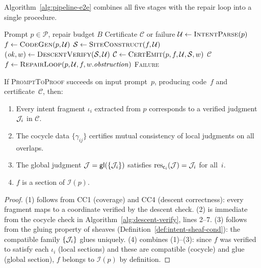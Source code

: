 \documentclass[11pt]{article}
\newcommand{\PromptToProof}{\textsc{PromptToProof}}
\newcommand{\IntentSheaf}{\mathcal{I}}
\newcommand{\ProofCert}{\mathcal{C}}
\newcommand{\PromptSpace}{\mathcal{P}}
\newcommand{\IntentFrag}{\iota}
\newcommand{\CoverFam}{\mathcal{U}}
\newcommand{\Cocycle}{\gamma}
\newcommand{\GlueMap}{\mathsf{gl}}
\newcommand{\IntentParse}{\textsc{IntentParse}}
\newcommand{\CodeGen}{\textsc{CodeGen}}
\newcommand{\SiteConstruct}{\textsc{SiteConstruct}}
\newcommand{\DescentVerify}{\textsc{DescentVerify}}
\newcommand{\CertEmit}{\textsc{CertEmit}}
\newcommand{\RepairLoop}{\textsc{RepairLoop}}
\begin{document}
Algorithm~\ref{alg:pipeline-e2e} combines all five stages with the
repair loop into a single procedure.

\begin{algorithm}[t]
\caption{\PromptToProof: End-to-end pipeline}\label{alg:pipeline-e2e}
\begin{algorithmic}[1]
\REQUIRE Prompt $p \in \PromptSpace$, repair budget $B$
\ENSURE Certificate $\ProofCert$ or failure
\STATE $\CoverFam \leftarrow \IntentParse(p)$
\STATE $f \leftarrow \CodeGen(p, \CoverFam)$
  \STATE $\Site \leftarrow \SiteConstruct(f, \CoverFam)$
  \STATE $(\mathit{ok}, w) \leftarrow \DescentVerify(\Site, \CoverFam)$
    \STATE $\ProofCert \leftarrow \CertEmit(p, f, \CoverFam, \Site, w)$
    \RETURN $\ProofCert$
  \ELSE
    \STATE $f \leftarrow \RepairLoop(p, \CoverFam, f, w.\mathit{obstruction})$
  \ENDIF
\ENDFOR
\RETURN \textsc{Failure}
\end{algorithmic}
\end{algorithm}

\begin{theorem}\label{thm:pipeline-correct}
If \PromptToProof{} succeeds on input prompt~$p$, producing
code~$f$ and certificate~$\ProofCert$, then:
\begin{enumerate}[noitemsep]
  \item Every intent fragment $\IntentFrag_i$ extracted from $p$
    corresponds to a verified judgment $\mathcal{J}_i$ in $\ProofCert$.
  \item The cocycle data $\{\Cocycle_{ij}\}$ certifies mutual
    consistency of local judgments on all overlaps.
  \item The global judgment $\J = \GlueMap(\{\J_i\})$ satisfies
    $\mathrm{res}_{\mathsf{c}_i}(\mathcal{J}) = \mathcal{J}_i$ for all~$i$.
  \item $f$ is a section of $\IntentSheaf(p)$.
\end{enumerate}
\end{theorem}

\begin{proof}
(1) follows from CC1 (coverage) and CC4 (descent correctness):
every fragment maps to a coordinate verified by the descent check.
(2) is immediate from the cocycle check in Algorithm~\ref{alg:descent-verify},
lines 2--7. (3) follows from the gluing property of sheaves
(Definition~\ref{def:intent-sheaf-cond}): the compatible family
$\{\mathcal{J}_i\}$ glues uniquely.  (4) combines (1)--(3): since $f$ was
verified to satisfy each $\IntentFrag_i$ (local sections) and these
are compatible (cocycle) and glue (global section), $f$ belongs to
$\IntentSheaf(p)$ by definition.
\end{proof}
\end{document}
